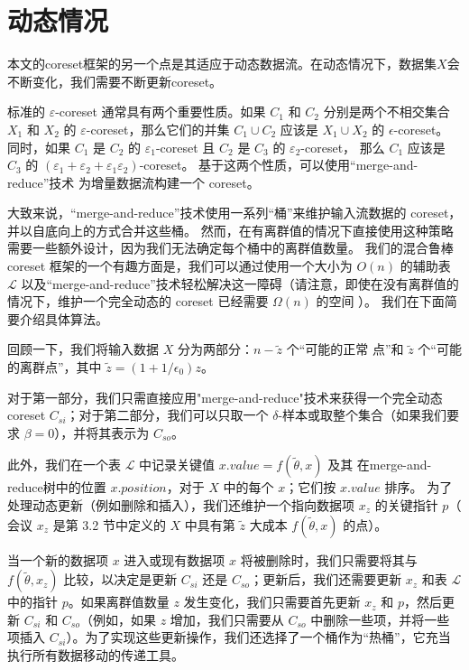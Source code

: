 \section{动态情况}

本文的coreset框架的另一个点是其适应于动态数据流。在动态情况下，数据集$X$会不断变化，我们需要不断更新coreset。

标准的 $\varepsilon$-coreset 通常具有两个重要性质。如果 $C_1$ 和 $C_2$ 分别是两个不相交集合 $X_1$ 
和 $X_2$ 的 $\varepsilon$-coreset，那么它们的并集 $C_1 \cup C_2$ 应该是 $X_1 \cup X_2$ 的 $\epsilon$-coreset。
同时，如果 $C_1$ 是 $C_2$ 的 $\varepsilon_1$-coreset 且 $C_2$ 是 $C_3$ 的 $\varepsilon_2$-coreset，
那么 $C_1$ 应该是 $C_3$ 的 $(\varepsilon_1 + \varepsilon_2 + \varepsilon_1 \varepsilon_2)$-coreset。
基于这两个性质，可以使用“merge-and-reduce”技术 \citep{BS80, HM04} 为增量数据流构建一个 coreset。


大致来说，“merge-and-reduce”技术使用一系列“桶”来维护输入流数据的 coreset，并以自底向上的方式合并这些桶。
然而，在有离群值的情况下直接使用这种策略需要一些额外设计，因为我们无法确定每个桶中的离群值数量。
我们的混合鲁棒 coreset 框架的一个有趣方面是，我们可以通过使用一个大小为 $O(n)$ 的辅助表 $\mathcal{L}$ 
以及“merge-and-reduce”技术轻松解决这一障碍（请注意，即使在没有离群值的情况下，维护一个完全动态的 coreset 已经需要 $\Omega(n)$ 的空间 \citep{HK20}）。
我们在下面简要介绍具体算法。

回顾一下，我们将输入数据 $X$ 分为两部分：$n - \tilde{z}$ 个“可能的正常
点”和 $\tilde{z}$ 个“可能的离群点”，其中 $\tilde{z} = (1 + 1/\epsilon_0)z$。

对于第一部分，我们只需直接应用"merge-and-reduce"技术来获得一个完全动态 coreset $C_{si}$；对于第二部分，我们可以只取一个 $\delta$-样本或取整个集合（如果我们要求 $\beta = 0$），并将其表示为 $C_{so}$。

此外，我们在一个表 $\mathcal{L}$ 中记录关键值 $x.value = f(\tilde{\theta}, x)$ 及其
在merge-and-reduce树中的位置 $x.position$，对于 $X$ 中的每个 $x$；它们按 $x.value$ 排序。
为了处理动态更新（例如删除和插入），我们还维护一个指向数据项 $x_z$ 的关键指针 $p$（
会议 $x_z$ 是第 3.2 节中定义的 $X$ 中具有第 $\tilde{z}$ 大成本 $f(\tilde{\theta}, x)$ 的点）。

当一个新的数据项 $x$ 进入或现有数据项 $x$ 将被删除时，我们只需要将其与 $f(\tilde{\theta}, x_z)$ 比较，以决定是更新 $C_{si}$ 还是 $C_{so}$；更新后，我们还需要更新 $x_z$ 和表 $\mathcal{L}$ 中的指针 $p$。如果离群值数量 $z$ 发生变化，我们只需要首先更新 $x_z$ 和 $p$，然后更新 $C_{si}$ 和 $C_{so}$（例如，如果 $z$ 增加，我们只需要从 $C_{so}$ 中删除一些项，并将一些项插入 $C_{si}$）。为了实现这些更新操作，我们还选择了一个桶作为“热桶”，它充当执行所有数据移动的传递工具。

